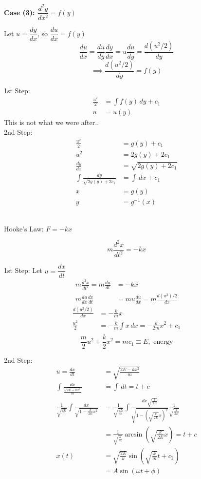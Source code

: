 \documentclass[twoside]{scrartcl}
\begin{document}
\textbf{Case (3): $\dfrac{d^2y}{dx^2} = f(y)$}

Let $u = \dfrac{dy}{dx}$, so $\dfrac{du}{dx} = f(y)$
\[
  \frac{du}{dx} = \frac{du}{dy}\frac{dy}{dx} = u\frac{du}{dy} =\frac{d(u^2/2)}{dy}\]
\[  \implies \frac{d(u^2/2)}{dy} = f(y)
\]

1st Step:\[
\begin{aligned}
  \frac{u^2}{2} &= \int f(y)\,dy + c_1\\
  u &= u(y)
\end{aligned}
\]
This is not what we were after..\\

2nd Step:
\[
\begin{aligned}
  \frac{u^2}{2} &= g(y) + c_1\\
  u^2 &= 2g(y) + 2c_1\\
  \frac{dy}{dx} &= \sqrt{2g(y) + 2c_1}\\
  \int \frac{dy}{\sqrt{2g(y)+2c_1}} &= \int \,dx + c_1\\
  x &= g(y)\\
  y &= g^{-1}(x)
\end{aligned}
\]~\\

\begin{example}
	Hooke's Law: $F = -kx$
	
	\[m\frac{d^2x}{dt^2} = -kx\]
	
1st Step:
Let $u = \dfrac{dx}{dt}$
\[
\begin{aligned}
  m\frac{d^2x}{dt^2} = m\frac{du}{dt} &= -kx\\
  m\frac{du}{dx}\frac{dx}{dt} &= mu\frac{du}{dx} = m\frac{d(u^2)/2}{dx}
\end{aligned}
\]
\[
\begin{aligned}
  \frac{d(u^2/2)}{dx} &= -\frac{k}{m}x\\
  \frac{u^2}{2} &= -\frac{k}{m}\int x\,dx = -\frac{k}{2m}x^2 + c_1\\
\end{aligned}
\]
\[\frac{m}{2}u^2 + \frac{k}{2}x^2 = mc_1 \equiv E, \text{ energy}\]

2nd Step:
\[
\begin{aligned}
  u = \frac{dx}{dt} &= \sqrt{\frac{2E -kx^2}{m}}\\
  \int \frac{dx}{\frac{\sqrt{2E-kx^2}}{m}} &= \int \,dt = t +c\\
  \frac{1}{\sqrt{\frac{2E}{m}}}\int \frac{dx}{\sqrt{1-\frac{k}{2E}x^2}} &=  \frac{1}{\sqrt{\frac{2E}{m}}} \int \frac{dx\sqrt{\frac{k}{2E}}}{\sqrt{1-\left(\sqrt{\frac{k}{2E}}x\right)^2}}\frac{1}{\sqrt{\frac{k}{2E}}}\\
  &= \frac{1}{\sqrt{\frac{k}{m}}}\arcsin\left(\sqrt{\frac{k}{2E}}x\right) = t+c\\
  x(t) &= \sqrt{\frac{2E}{k}}\sin\left(\sqrt{\frac{k}{m}}t + c_2\right)\\
  &= A\sin(\omega t + \phi)
\end{aligned}
\]
\end{example}
\end{document}
